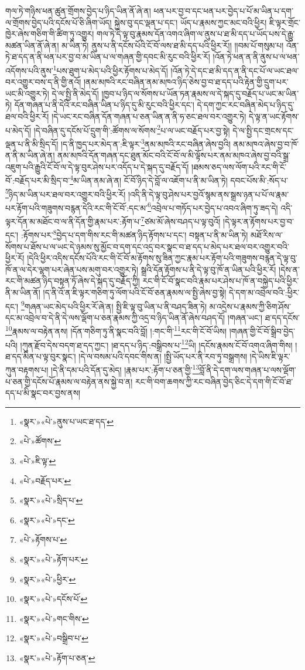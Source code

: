 གལ་ཏེ་གཉིས་ཕན་ཚུན་གྲོགས་བྱེད་པ་ཉིད་ཡིན་ནོ་ཞེ་ན། ཕན་པར་བྱ་བ་དང་ཕན་པར་བྱེད་པ་པོ་མ་ཡིན་པ་དག་ལ་གྲོགས་བྱེད་པའི་དངོས་པོ་ཅི་ཞིག་ཡོད། སྐྱེས་བུ་དང་ལྡན་པ་དང་། ཡོད་པ་རྣམས་ཀྱང་མང་བའི་ཕྱིར། ཇི་ལྟར་གྲོང་ཁྱེར་ཞེས་གཅིག་གི་ཚིག་ཏུ་འགྱུར། གལ་ཏེ་དེ་ལྟ་བུ་རྣམས་དོན་འགའ་ཞིག་ལ་ནུས་པ་ཐ་མི་དད་པ་ཡོད་པས་དེ་རྒྱུ་མཚན་ཡིན་ནོ་ཞེ་ན། མ་ཡིན་ཏེ། ནུས་པ་ནི་དངོས་པོའི་ངོ་བོ་ལས་ཐ་མི་དད་པའི་ཕྱིར་རོ།། །།བམ་པོ་གསུམ་པ། འོན་ཏེ་ཐ་དད་ན་ནི་ཕན་པར་བྱ་བ་མ་ཡིན་པ་ལ་གཞན་གྱི་དབང་མི་རུང་བའི་ཕྱིར་རོ། །འོན་ཏེ་ཕན་ན་ནི་ནུས་པ་ལ་ཕན་འདོགས་པའི་ནུས་\footnote{«སྣར་»«པེ་»ནུས་པ་ཡང་ཐ་དད་}པས་ཐུག་པ་མེད་པའི་ཕྱིར་རྟོགས་པ་མེད་དོ། །འོན་ཏེ་དེ་དང་ཐ་མི་དད་ན་ནི་དང་པོ་ལ་ཡང་ཐལ་བར་འགྱུར་བས་ད་ནི་གྱི་ནའོ། །ནམ་མཁའི་རང་བཞིན་ནམ་མཁའ་ཉིད་ཅེས་བྱ་བ་ཐ་དད་པའི་རྟེན་གྱི་དྲུག་པར་ཡང་མི་འགྱུར་ཏེ། དེ་ལ་སྤྱི་ནི་མེད་དོ། །ཁྱབ་པ་ཉིད་ལ་སོགས་པ་ཡོན་ཏན་རྣམས་ལ་དེ་སྐད་དུ་བརྗོད་པ་ཡང་མ་ཡིན་ཏེ། དོན་གཞན་པ་ནི་དེའི་རང་བཞིན་ཡིན་པ་ཉིད་དུ་མི་རུང་བའི་ཕྱིར་དང་། དེ་དག་ཀྱང་རང་བཞིན་མེད་པ་ཉིད་དུ་ཐལ་བའི་ཕྱིར་རོ། །དེ་ཡང་རང་བཞིན་དོན་གཞན་པ་ཅན་ཡིན་ན་ནི་ཧ་ཅང་ཐལ་བར་འགྱུར་ཏེ། དེ་ལྟ་ན་ཡང་རྟོགས་པ་མེད་དོ། །དེ་བཞིན་དུ་དངོས་པོ་དྲུག་གི་:ཚོགས་ལ་སོགས་\footnote{«པེ་»ཚོགས་}པ་ལ་ཡང་བརྗོད་པར་བྱ་སྟེ། དེ་ལ་སྤྱི་དང་གྲངས་དང་ལྡན་པ་ནི་མི་སྲིད་དོ། །ད་ནི་ཁྱད་པར་མེད་ན་:ཇི་ལྟར་\footnote{«པེ་»ཇི་ལྟ་}ནམ་མཁའི་རང་བཞིན་ཞེས་བྱའི། ནམ་མཁའ་ཞེས་བྱ་བ་ཁོ་ན་ནི་མ་ཡིན་ཞེ་ན། ནམ་མཁའི་དོན་གཞན་དང་ཐུན་མོང་བའི་ངོ་བོ་ལ་མི་ལྟོས་པར་ནམ་མཁའ་ཞེས་བྱ་བའི་སྒྲ་འཇུག་པའི་རྒྱུའི་ངོ་བོ་ལ་དེ་ལྟ་བུར་ཤེས་པར་འདོད་པ་དེ་སྐད་དུ་བརྗོད་དོ། །ཐམས་ཅད་ལས་ལོག་པའི་རང་གི་ངོ་བོ་:བརྗོད་པར་མི་སྲིད་བ་\footnote{«པེ་»བརྗོད་པར་}མ་ཡིན་ནམ་ཞེ་ན། ངོ་བོ་ཉིད་དེ་བློ་ལ་འཇོག་པ་ནི་མ་ཡིན་ཏེ། དབང་པོས་མི་:སོད་པ་\footnote{«སྣར་»«པེ་»སྲིད་པ་}ཉིད་མ་ཡིན་པར་ཐལ་བར་འགྱུར་བའི་ཕྱིར་རོ། །འདི་ནི་དེ་ལྟ་བུ་ཤེས་པར་བྱའོ་སྙམ་ནས་སྒྲས་ཉན་པ་པོ་ལ་རྣམ་པར་རྟོག་པའི་གཟུགས་བརྙན་དེའི་རང་གི་ངོ་བོ་:དང་མ་\footnote{«སྣར་»«པེ་»དང་}འབྲེལ་པ་གཏོད་པར་བྱེད་པ་འབའ་ཞིག་ཏུ་ཟད་དེ། འདི་ལྟར་དོན་མ་མཐོང་བ་ལ་ནི་དོན་གྱི་རྣམ་པར་:རྟོག་པ་\footnote{«པེ་»རྟོགས་པ་}ཙམ་མོ་ཞེས་བཤད་པ་ལྟ་བུའོ། །དེ་ལྟར་ན་རྟོགས་པར་བྱ་བ་དང་། :རྟོགས་པར་\footnote{«སྣར་»«པེ་»རྟོག་པར་}བྱེད་པ་དག་གིས་རང་གི་མཚན་ཉིད་རྟོགས་པ་དང་། བསྟན་པ་ནི་མ་ཡིན་ཏེ། མཐོ་རིས་ལ་སོགས་པ་ཐོས་པ་ལ་ཡང་དེ་ཉམས་སུ་མྱོང་བ་དག་དང་འདྲ་བར་སྣང་བ་ཐ་དད་པ་མེད་པར་ཐལ་བར་འགྱུར་བའི་ཕྱིར་རོ། །དེའི་ཕྱིར་འདིས་དངོས་པོའི་རང་གི་ངོ་བོ་མ་རྟོགས་སུ་ཟིན་ཀྱང་རྣམ་པར་རྟོག་པའི་གཟུགས་བརྙན་དེ་ལྟ་བུ་ཁོ་ན་ལ་དེར་ལྷག་པར་ཞེན་པས་མགུ་བར་འགྱུར་ཏེ། སྒྲའི་དོན་རྟོགས་པ་ནི་དེ་ལྟ་བུ་ཁོ་ན་ཡིན་པའི་ཕྱིར་རོ། །དེས་ན་རང་གི་མཚན་ཉིད་བསྟན་ཏོ་ཞེས་དེ་སྐད་དུ་བརྗོད་ཀྱི། རང་གི་ངོ་བོ་སྣང་བའི་རྣམ་པར་ཤེས་པ་ཁོ་ན་བསྐྱེད་པའི་ཕྱིར་ནི་མ་ཡིན་ནོ། །ད་ནི་འོ་ན་ཇི་ལྟར་གཅིག་ཏུ་ལོག་པའི་ངོ་བོ་ཅན་རྣམས་ལ་སྤྱི་ཞེས་བྱ་སྟེ། དེ་དག་མ་འབྲེལ་བའི་:ཕྱིར་དང་། \footnote{«སྣར་»«པེ་»ཕྱིར་}གཞན་ཡང་མེད་པའི་ཕྱིར་རོ་ཞེ་ན། སྤྱི་ཇི་ལྟ་བུ་ཡིན་པ་ནི་བཤད་ཟིན་ཏེ། མ་འདྲེས་པ་རྣམས་ཀྱི་ཅིག་ཤོས་དང་མ་འབྲེལ་བ་དེ་ནི་དེ་ལས་ལྡོག་པ་ཅན་རྣམས་ཀྱི་འདྲ་བ་ཉིད་ཡིན་ནོ་ཞེས་བཤད་དོ། །གཞན་ཡང་། ཐ་དད་དངོས་\footnote{«སྣར་»«པེ་»དངོས་པོ་}རྣམས་ལ་བརྟེན་ནས། །དོན་གཅིག་ཏུ་ནི་སྣང་བའི་བློ། །:གང་གི་\footnote{«སྣར་»«པེ་»གང་གིས་}རང་གི་ངོ་བོ་ཡིས། །གཞན་གྱི་ངོ་བོ་སྒྲིབ་བྱེད་པའི། །ཀུན་རྫོབ་དེས་བདག་ཐ་དད་ཀྱང་། །ཐ་དད་པ་ཉིད་:བསྒྲིབས་པ་\footnote{«སྣར་»«པེ་»བསྒྲིབ་པ་}ཡི། །དངོས་རྣམས་ངོ་བོ་འགའ་ཞིག་གིས། །ཐ་དད་མིན་པ་ལྟ་བུར་སྣང་། །དེ་ལ་བསམ་པའི་དབང་གིས་ན། །སྤྱི་ཡོད་པར་ནི་རབ་ཏུ་བསྒྲགས། །དེ་ཡིས་ཇི་ལྟར་ཀུན་བརྟགས་པ། །དེ་ནི་དམ་པའི་དོན་དུ་མེད། །རྣམ་པར་:རྟོག་པ་ཅན་གྱི་\footnote{«སྣར་»«པེ་»རྟོག་པ་ཅན་}བློ་ནི་དེ་དག་ལས་གཞན་པ་ལས་ལྡོག་པ་ཅན་གྱི་དངོས་པོ་རྣམས་ལ་བརྟེན་ནས་སྐྱེ་བ་ན། རང་གི་བག་ཆགས་ཀྱི་རང་བཞིན་བྱེད་ཅིང་དེ་དག་གི་ངོ་བོ་ཐ་དད་པ་མི་སྣང་བར་བྱས་ནས། 